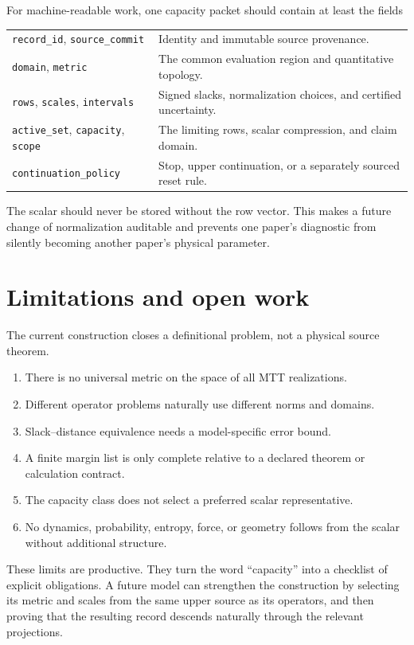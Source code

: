 \documentclass[11pt]{article}
\theoremstyle{definition}
\theoremstyle{remark}
\begin{document}
For machine-readable work, one capacity packet should contain at least the
fields
\begin{center}
\begin{tabularx}{0.94\textwidth}{@{}L{0.29\textwidth}Y@{}}
\texttt{record\_id}, \texttt{source\_commit}
& Identity and immutable source provenance.\\
\texttt{domain}, \texttt{metric}
& The common evaluation region and quantitative topology.\\
\texttt{rows}, \texttt{scales}, \texttt{intervals}
& Signed slacks, normalization choices, and certified uncertainty.\\
\texttt{active\_set}, \texttt{capacity}, \texttt{scope}
& The limiting rows, scalar compression, and claim domain.\\
\texttt{continuation\_policy}
& Stop, upper continuation, or a separately sourced reset rule.\\
\end{tabularx}
\end{center}
The scalar should never be stored without the row vector.  This makes a
future change of normalization auditable and prevents one paper's
diagnostic from silently becoming another paper's physical parameter.

\section{Limitations and open work}
\label{sec:limits}

The current construction closes a definitional problem, not a physical
source theorem.
\begin{enumerate}[leftmargin=2em]
\item There is no universal metric on the space of all MTT realizations.
\item Different operator problems naturally use different norms and
      domains.
\item Slack--distance equivalence needs a model-specific error bound.
\item A finite margin list is only complete relative to a declared theorem
      or calculation contract.
\item The capacity class does not select a preferred scalar representative.
\item No dynamics, probability, entropy, force, or geometry follows from
      the scalar without additional structure.
\end{enumerate}

These limits are productive.  They turn the word ``capacity'' into a
checklist of explicit obligations.  A future model can strengthen the
construction by selecting its metric and scales from the same upper source
as its operators, and then proving that the resulting record descends
naturally through the relevant projections.
\end{document}
